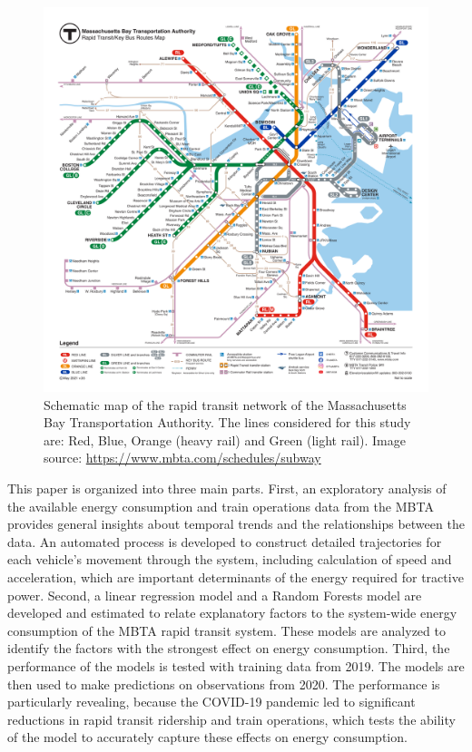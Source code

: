 \documentclass[times]{TRR}
\begin{document}
\begin{figure}[h!]
    \centering
    \includegraphics[width=.7\textwidth]{Figure_1_subway_map_may_2021_GLX_stops.pdf}
    \caption{Schematic map of the rapid transit network of the Massachusetts Bay Transportation Authority. The lines considered for this study are: Red, Blue, Orange (heavy rail) and Green (light rail).
    Image source: \url{https://www.mbta.com/schedules/subway}
    }
    \label{fig1}
\end{figure}


This paper is organized into three main parts.  First, an exploratory analysis of the available energy consumption and train operations data from the MBTA provides general insights about temporal trends and the relationships between the data.  An automated process is developed to construct detailed trajectories for each vehicle’s movement through the system, including calculation of speed and acceleration, which are important determinants of the energy required for tractive power. Second, a linear regression model and a Random Forests model are developed and estimated to relate explanatory factors to the system-wide energy consumption of the MBTA rapid transit system. These models are analyzed to identify the factors with the strongest effect on energy consumption.  Third, the performance of the models is tested with training data from 2019. The models are then used to make predictions on observations from 2020.  The performance is particularly revealing, because the COVID-19 pandemic led to significant reductions in rapid transit ridership and train operations, which tests the ability of the model to accurately capture these effects on energy consumption.
\end{document}
